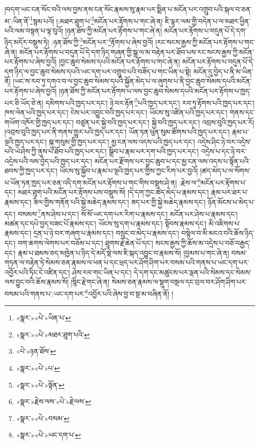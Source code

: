 །བདག་ཡང་ངན་སོང་བའི་ལས་བྱས་ནས་ངན་སོང་རྣམས་སུ་རྣམ་པར་སྨིན་པ་མངོན་པར་འགྲུབ་པའི་སྐལ་བ་ཅན་མ་:ཡིན་ནོ་\footnote{«སྣར་»«པེ་»ཡིན་པ་}སྙམ་པའོ། །:མཐར་ཐུག་པ་\footnote{«སྣར་»«པེ་»མཐར་ཐུག་པའི་}མངོན་པར་རྟོགས་པ་གང་ཞེ་ན། ཇི་ལྟར་ལམ་གྱི་བདེན་པ་ལ་མཐར་ཕྱིན་པའི་ལམ་བསྟན་པ་ལྟ་བུའོ། །ཉན་ཐོས་ཀྱི་མངོན་པར་རྟོགས་པ་གང་ཞེ་ན། མངོན་པར་རྟོགས་པ་བདུན་པོ་དེ་དག་ཉིད་མདོར་བསྡུས་ཏེ། :ཉན་ཐོས་ཀྱི་\footnote{«པེ་»ཉན་ཐོས་}མངོན་པར་\footnote{«སྣར་»«པེ་»པ་}རྟོགས་པ་ཞེས་བྱའོ། །རང་སངས་རྒྱས་ཀྱི་མངོན་པར་རྟོགས་པ་གང་ཞེ་ན། མངོན་པར་རྟོགས་པ་བདུན་པོ་དེ་དག་ཉིད་གཞན་གྱི་སྒྲ་ལ་མ་བརྟེན་པར་ཐོབ་པས་རང་སངས་རྒྱས་ཀྱི་མངོན་པར་རྟོགས་པ་ཞེས་བྱའོ། །བྱང་ཆུབ་སེམས་དཔའི་མངོན་པར་རྟོགས་པ་གང་ཞེ་ན། མངོན་པར་རྟོགས་པ་བདུན་པོ་དེ་དག་ཉིད་ལ་བྱང་ཆུབ་སེམས་དཔའི་ཡང་དག་པར་འགྲུབ་པའི་བཟོད་པ་གང་ཡིན་པ་སྟེ། མངོན་དུ་བྱེད་པ་ནི་མ་ཡིན་ནོ། །ཡང་ས་རབ་ཏུ་དགའ་བ་ལ་བྱང་ཆུབ་སེམས་དཔའི་སྐྱོན་མེད་པ་ལ་ཞུགས་པ་ནི་བྱང་ཆུབ་སེམས་དཔའི་མངོན་པར་རྟོགས་པ་ཞེས་བྱའོ། །ཉན་ཐོས་ཀྱི་མངོན་པར་རྟོགས་པ་ལས་བྱང་ཆུབ་སེམས་དཔའི་མངོན་པར་རྟོགས་པ་ཁྱད་པར་ཅི་ཡོད་ཅེ་ན། དམིགས་པའི་ཁྱད་པར་དང་། ཉེ་བར་རྟོན་\footnote{«སྣར་»«པེ་»སྟོན་}པའི་ཁྱད་པར་དང་། རབ་ཏུ་རྟོགས་པའི་ཁྱད་པར་དང་། ཁས་ལེན་པའི་ཁྱད་པར་དང་། ངེས་པར་འབྱུང་བའི་ཁྱད་པར་དང་། ཡོངས་སུ་འཛིན་པའི་ཁྱད་པར་དང་། གནས་དང་གཡོག་འཁོར་གྱི་ཁྱད་པར་དང་། བཙུན་པར་སྐྱེ་བའི་ཁྱད་པར་དང་། སྐྱེ་བའི་ཁྱད་པར་དང་། འབྲས་བུའི་ཁྱད་པར་རོ། །འབྲས་བུའི་ཁྱད་པར་ནི་གནས་གྱུར་པའི་ཁྱད་པར་དང་། ཡོན་ཏན་ཕུན་སུམ་ཚོགས་པའི་ཁྱད་པར་དང་། རྣམ་པ་ལྔའི་ཁྱད་པར་དང་། སྐུ་གསུམ་གྱི་ཁྱད་པར་དང་། མྱ་ངན་ལས་འདས་པའི་ཁྱད་པར་དང་། འདྲེས་ཤིང་ཉེ་བར་འདྲེས་པའི་ཡེ་ཤེས་ཀྱི་ནུས་པ་ཐོབ་པའི་ཁྱད་པར་དང་། སྒྲིབ་པ་རྣམ་པར་དག་པའི་ཁྱད་པར་དང་། འདྲེས་པ་དང་ཉེ་བར་འདྲེས་པའི་ལས་བྱེད་པའི་ཁྱད་པར་དང་། མངོན་པར་རྫོགས་པར་བྱང་ཆུབ་པ་དང་མྱ་ངན་ལས་འདས་པ་སྟོན་པའི་ཐབས་ཀྱི་ཁྱད་པར་དང་། ཡོངས་སུ་སྐྱོབ་པ་རྣམ་པ་ལྔའི་ཁྱད་པར་གྱིས་ཀྱང་རིག་པར་བྱའོ། །ཚད་མེད་པ་ལ་སོགས་པ་ཡོན་ཏན་ཁྱད་པར་ཅན་འདི་དག་མངོན་པར་རྟོགས་པ་གང་གིས་བསྡུས་ཤེ་ན། :རྗེས་ལ་\footnote{«སྣར་»རྗེས་ལས་«པེ་»རྗེ་ལས་}མངོན་པར་རྟོགས་པ་དང་། མཐར་ཐུག་པའི་མངོན་པར་རྟོགས་པས་བསྡུས་སོ། །དེ་དག་ཀྱང་ཚད་མེད་པ་རྣམས་དང་། རྣམ་པར་ཐར་པ་རྣམས་དང་། ཟིལ་གྱིས་གནོན་པའི་སྐྱེ་མཆེད་རྣམས་དང་། ཟད་པར་གྱི་སྐྱེ་མཆེད་རྣམས་དང་། ཉོན་མོངས་པ་མེད་པ་དང་། བསམས་\footnote{«སྣར་»«པེ་»བསམ་}ནས་ཤེས་པ་དང་། སོ་སོ་ཡང་དག་པར་རིག་པ་རྣམས་དང་། མངོན་པར་ཤེས་པ་རྣམས་དང་། མཚན་དང་དཔེ་བྱད་བཟང་པོ་རྣམས་དང་། ཡོངས་སུ་དག་པ་རྣམས་དང་། སྟོབས་རྣམས་དང་། མི་འཇིགས་པ་རྣམས་དང་། དྲན་པ་ཉེ་བར་གཞག་པ་རྣམས་དང་། བསྲུང་བ་མེད་པ་རྣམས་དང་། བསྙེལ་བ་མི་མངའ་བའི་ཆོས་ཉིད་དང་། བག་ཆགས་ལེགས་པར་བཅོམ་པ་དང་། ཐུགས་རྗེ་ཆེན་པོ་དང་། སངས་རྒྱས་ཀྱི་ཆོས་མ་འདྲེས་པ་བཅོ་བརྒྱད་དང་། རྣམ་པ་ཐམས་ཅད་མཁྱེན་པ་ཉིད་དེ་མདོ་སྡེ་ལས་ཇི་སྐད་འབྱུང་བ་རྣམས་སོ། །བྱམས་པ་གང་ཞེ་ན། བསམ་གཏན་ལ་བརྟེན་ཏེ་སེམས་ཅན་རྣམས་ལ་ཕན་པ་དང་ཕྲད་པར་ཤོག་ཤིག་པར་བསམ་པའི་གནས་པ་ཡང་དག་པར་འབྱོར་པའི་ཏིང་ངེ་འཛིན་དང་། ཤེས་རབ་གང་ཡིན་པ་དང་། དེ་དག་དང་མཚུངས་པར་ལྡན་པའི་སེམས་དང་སེམས་ལས་བྱུང་བའི་ཆོས་རྣམས་སོ། །སྙིང་རྗེ་གང་ཞེ་ན། སེམས་ཅན་རྣམས་ལ་སྡུག་བསྔལ་དང་བྲལ་བར་ཤོག་ཤིག་པར་བསམ་པའི་གནས་པ་:ཡང་དག་པར་\footnote{«སྣར་»«པེ་»ཡང་དག་པ་}འབྱོར་པའི་ཞེས་བྱ་བ་སྔ་མ་བཞིན་ནོ། །
